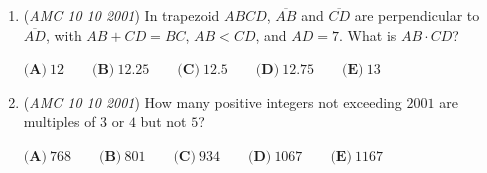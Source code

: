 \begin{enumerate}
	\item (\textit{AMC 10 10 2001}) In trapezoid $ABCD$, $\overline{AB}$ and $\overline{CD}$ are perpendicular to $\overline{AD}$, with $AB+CD=BC$, $AB<CD$, and $AD=7$. What is $AB\cdot CD$?


 $\textbf{(A)}\ 12 \qquad \textbf{(B)}\ 12.25 \qquad \textbf{(C)}\ 12.5 \qquad \textbf{(D)}\ 12.75 \qquad \textbf{(E)}\ 13$


	\item (\textit{AMC 10 10 2001}) How many positive integers not exceeding $2001$ are multiples of $3$ or $4$ but not $5$?


 $\textbf{(A)}\ 768 \qquad \textbf{(B)}\ 801 \qquad \textbf{(C)}\ 934 \qquad \textbf{(D)}\ 1067 \qquad \textbf{(E)}\ 1167$


\end{enumerate}